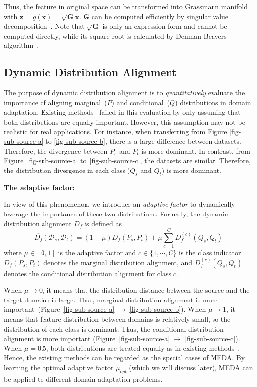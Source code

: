 \documentclass[sigconf]{acmart}
\begin{document}
Thus, the feature in original space can be transformed into Grassmann manifold with $\mathbf{z}=g(\mathbf{x}) = \sqrt{\mathbf{G}}\mathbf{x}$. $\mathbf{G}$ can be computed efficiently by singular value decomposition~\cite{gong2012geodesic}. Note that $\sqrt{\mathbf{G}}$ is only an expression form and cannot be computed directly, while its square root is calculated by Denman-Beavers algorithm~\cite{denman1976matrix}.

\label{sec-da}
\subsection{Dynamic Distribution Alignment}

The purpose of dynamic distribution alignment is to \textit{quantitatively} evaluate the importance of aligning marginal~($P$) and conditional~($Q$) distributions in domain adaptation.
Existing methods~\cite{long2013transfer,zhang2017joint} failed in this evaluation by only assuming that both distributions are equally important. However, this assumption may not be realistic for real applications. For instance, when transferring from Figure \ref{fig-sub-source-a} to \ref{fig-sub-source-b}, there is a large difference between datasets. Therefore, the divergence between $P_s$ and $P_t$ is more dominant. In contrast, from Figure~\ref{fig-sub-source-a} to~\ref{fig-sub-source-c}, the datasets are similar. Therefore, the distribution divergence in each class ($Q_s$ and $Q_t$) is more dominant. 

\textbf{The adaptive factor:}

In view of this phenomenon, we introduce an \textit{adaptive factor} to dynamically leverage the importance of these two distributions. Formally, the dynamic distribution alignment $\overline{D_f}$ is defined as
\begin{equation}
	\label{equ-bda}
	\overline{D_{f}}(\mathcal{D}_s,\mathcal{D}_t) = (1- \mu)D_{f}(P_s,P_t) + \mu \sum_{c=1}^{C} D^{(c)}_{f}(Q_s,Q_t)
\end{equation}
where $\mu \in [0,1]$ is the adaptive factor and $c \in \{1,\cdots,C\}$ is the class indicator. $D_f(P_s,P_t)$ denotes the marginal distribution alignment, and $D^{(c)}_f(Q_s,Q_t)$ denotes the conditional distribution alignment for class $c$.

When $\mu \rightarrow 0$, it means that the distribution distance between the source and the target domains is large. Thus, marginal distribution alignment is more important~(Figure~\ref{fig-sub-source-a} $\rightarrow$ \ref{fig-sub-source-b}). When $\mu \rightarrow 1$, it means that feature distribution between domains is relatively small, so the distribution of each class is dominant. Thus, the conditional distribution alignment is more important (Figure~\ref{fig-sub-source-a} $\rightarrow$ \ref{fig-sub-source-c}). When $\mu=0.5$, both distributions are treated equally as in existing methods~\cite{long2013transfer,zhang2017joint}. Hence, the existing methods can be regarded as the special cases of MEDA. By learning the optimal adaptive factor $\mu_{opt}$ (which we will discuss later), MEDA can be applied to different domain adaptation problems.
\end{document}
